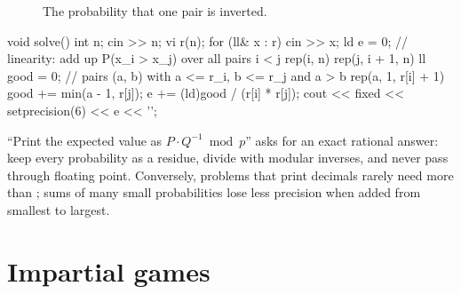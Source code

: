 \begin{figure}[htbp]
\centering
{}
\caption{The probability that one pair is inverted.}
\label{fig:inversion}
\end{figure}

\begin{code}
void solve() {
    int n;
    cin >> n;
    vi r(n);
    for (ll& x : r) cin >> x;
    ld e = 0;  // linearity: add up P(x_i > x_j) over all pairs i < j
    rep(i, n) rep(j, i + 1, n) {
        ll good = 0;  // pairs (a, b) with a <= r_i, b <= r_j and a > b
        rep(a, 1, r[i] + 1) good += min(a - 1, r[j]);
        e += (ld)good / (r[i] * r[j]);
    }
    cout << fixed << setprecision(6) << e << '\n';
}
\end{code}

\begin{pitfall}
``Print the expected value as $P \cdot Q^{-1} \bmod p$'' asks for an exact rational answer: keep every probability as a residue, divide
with modular inverses, and never pass through floating point. Conversely, problems that print decimals rarely need more than
; sums of many small probabilities lose less precision when added from smallest to largest.
\end{pitfall}

\section[Impartial games]{Impartial games \hfill \plat}\label{sec:games}

